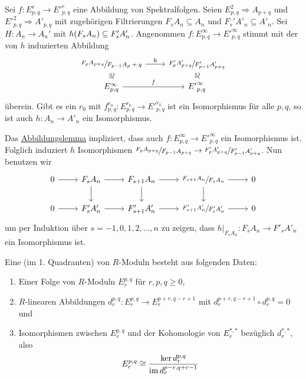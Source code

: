 \begin{satz}[name={Vergleichssatz}]
	Sei $f \colon E^r_{p,q} \to {E'}^r_{p,q}$ eine Abbildung von Spektralfolgen.
	Seien $E^2_{p,q} \Rightarrow A_{p+q}$ und ${E'}^2_{p,q} \Rightarrow A'_{p,q}$ mit zugehörigen Filtrierungen $F_s A_n \subseteq A_n$ und $F_s' A'_n \subseteq A'_n$.
	Sei $H \colon A_n \to A_n'$ mit $h \enbrace*{F_s A_n} \subseteq F_s' A'_n$.
	Angenommen $f \colon E^\infty_{p,q} \to {E'}^\infty_{p,q}$ stimmt mit der von $h$ induzierten Abbildung 
	\[
		\begin{tikzcd}[row sep=small]
			\sfrac{F_p A_{p+q}}{F_{p-1} A_p+q} \rar["h"] \dar[phantom,"\cong", sloped] &\sfrac{F'_p A'_{p+q}}{F'_{p-1} A'_{p+q}} \dar[phantom,"\cong", sloped] \\
			E^\infty_{p,q} \rar["f"] & {E'}^\infty_{p,q}
		\end{tikzcd}
	\]
	überein. Gibt es ein $r_0$ mit $f^{r_0}_{p,q} \colon E^{r_0}_{p,q} \to {E'}^{r_0}_{p,q}$ ist ein Isomorphismus für alle $p,q$, so ist auch $h \colon A_n \to A'_n$ ein Isomorphismus.
\end{satz}
\begin{beweis}
	Das \hyperref[abb.lemma]{Abbildungslemma} impliziert, dass auch $f \colon E^\infty_{p,q} \to {E'}^\infty_{p,q}$ ein Isomorphismus ist.
	Folglich induziert $h$ Isomorphismen $\sfrac{F_p A_{p+q}}{F_{p-1}A_{p+q}} \to \sfrac{F'_p A'_{p+q}}{F'_{p-1} A'_{p+q}}$.
	Nun benutzen wir
	\[
		\begin{tikzcd}
			0 \rar & F_s A_n \rar \dar & F_{s+1} A_n \rar \dar & \sfrac{F_{s+1} A_n}{F_s A_n} \rar \dar & 0 \\
			0 \rar & F'_s A'_n \rar  & F'_{s+1} A'_n \rar & \sfrac{F'_{s+1} A'_n}{F'_s A'_n} \rar  & 0 
		\end{tikzcd}
	\]
	um per Induktion über $s=-1,0,1,2, \ldots ,n$ zu zeigen, dass $h\big|_{F_s A_n} \colon F_s A_n \to F'_s A'_n$ ein Isomorphismus ist.
\end{beweis}

\begin{definition}[{name=[kohomologische Spektralfolge]}]
	Eine  (im 1. Quadranten) von $R$-Moduln besteht aus folgenden Daten:
	\begin{enumerate}[1.]
		\item Einer Folge von $R$-Moduln $E^{p,q}_r$ für $r,p,q\ge0$, 
		\item $R$-linearen Abbildungen $d^{p,q}_r \colon E^{p,q}_r \to E_r^{p+r,q-r+1}$ mit $d^{p+r,q-r+1}_r \circ d^{p,q}_r =0$ und
		\item Isomorphismen zwischen $E^{p,q}_r$ und der Kohomologie von $E_r^{*,*}$ bezüglich $d_r^{*,*}$, also 
		\[
			E^{p,q}_r \cong \frac{\ker d_r^{p,q}}{\operatorname{im} d^{p-r,q+r-1}_r} 
		\]
	\end{enumerate}
\end{definition}
\newpage


